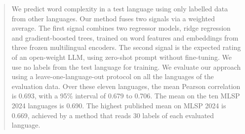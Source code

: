 \begin{abstract}
We predict word complexity in a test language using only labelled data from other languages. Our
method fuses two signals via a weighted average. The first signal combines two regressor models,
ridge regression and gradient-boosted trees, trained on word features and embeddings from three
frozen multilingual encoders. The second signal is the expected rating of an open-weight LLM, using %
zero-shot prompt without fine-tuning. We use no labels from the test language for training. We %
evaluate our approach using a leave-one-language-out protocol on all the languages of the evaluation
data. Over these eleven languages, the mean Pearson correlation is 0.693, with a 95\% interval of %
0.679 to 0.706. The mean on the ten MLSP 2024 languages is 0.690. The highest published mean on MLSP %
2024 is 0.669, achieved by a method that reads 30 labels of each evaluated language. %
\end{abstract}

